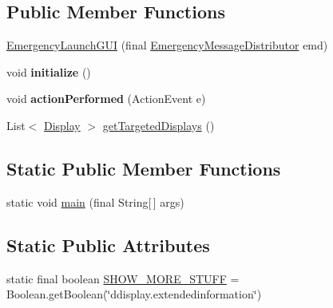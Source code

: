 \subsection*{Public Member Functions}
\begin{DoxyCompactItemize}
\item 
\hyperlink{classgov_1_1fnal_1_1ppd_1_1dd_1_1emergency_1_1EmergencyLaunchGUI_ada7b11d41e8fde113dfaf0e483dc58d6}{Emergency\-Launch\-G\-U\-I} (final \hyperlink{interfacegov_1_1fnal_1_1ppd_1_1dd_1_1emergency_1_1EmergencyMessageDistributor}{Emergency\-Message\-Distributor} emd)
\item 
\hypertarget{classgov_1_1fnal_1_1ppd_1_1dd_1_1emergency_1_1EmergencyLaunchGUI_a37456dacf8b47f32406a1803e50a0615}{void {\bfseries initialize} ()}\label{classgov_1_1fnal_1_1ppd_1_1dd_1_1emergency_1_1EmergencyLaunchGUI_a37456dacf8b47f32406a1803e50a0615}

\item 
\hypertarget{classgov_1_1fnal_1_1ppd_1_1dd_1_1emergency_1_1EmergencyLaunchGUI_a95c444847473b12b1323b5c954e15e67}{void {\bfseries action\-Performed} (Action\-Event e)}\label{classgov_1_1fnal_1_1ppd_1_1dd_1_1emergency_1_1EmergencyLaunchGUI_a95c444847473b12b1323b5c954e15e67}

\item 
List$<$ \hyperlink{interfacegov_1_1fnal_1_1ppd_1_1dd_1_1signage_1_1Display}{Display} $>$ \hyperlink{classgov_1_1fnal_1_1ppd_1_1dd_1_1emergency_1_1EmergencyLaunchGUI_a1932baa3595f9d2fed1984a3a2a21c25}{get\-Targeted\-Displays} ()
\end{DoxyCompactItemize}
\subsection*{Static Public Member Functions}
\begin{DoxyCompactItemize}
\item 
static void \hyperlink{classgov_1_1fnal_1_1ppd_1_1dd_1_1emergency_1_1EmergencyLaunchGUI_a182c4fee71b9dd4d099e75f2c1a44646}{main} (final String\mbox{[}$\,$\mbox{]} args)
\end{DoxyCompactItemize}
\subsection*{Static Public Attributes}
\begin{DoxyCompactItemize}
\item 
static final boolean \hyperlink{classgov_1_1fnal_1_1ppd_1_1dd_1_1emergency_1_1EmergencyLaunchGUI_a38b676d30b6ac1c12dbc4b790f93b729}{S\-H\-O\-W\-\_\-\-M\-O\-R\-E\-\_\-\-S\-T\-U\-F\-F} = Boolean.\-get\-Boolean(\char`\"{}ddisplay.\-extendedinformation\char`\"{})
\end{DoxyCompactItemize}

